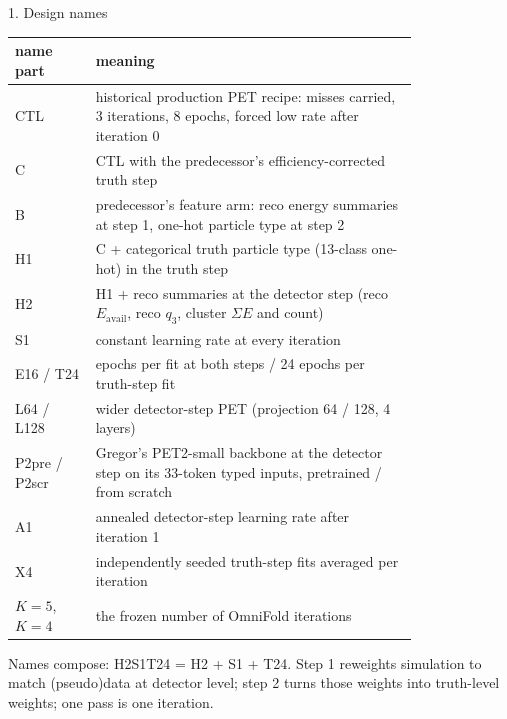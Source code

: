 \documentclass[aspectratio=169,10pt]{beamer}
\def\evidencetext{}
\begin{document}
\gdef\evidencetext{\texttt{DEVELOPMENT-20260926.md}; \texttt{PROTOCOL-20260925.md (5)}}
\begin{frame}{1. Design names}
{\scriptsize
\begin{tabular}{l>{\raggedright\arraybackslash}p{0.80\linewidth}}
\toprule
name part & meaning \\
\midrule
CTL & historical production PET recipe: misses carried, 3 iterations, 8 epochs, forced low rate after iteration 0 \\
C & CTL with the predecessor's efficiency-corrected truth step \\
B & predecessor's feature arm: reco energy summaries at step 1, one-hot particle type at step 2 \\
H1 & C + categorical truth particle type (13-class one-hot) in the truth step \\
H2 & H1 + reco summaries at the detector step (reco $E_\mathrm{avail}$, reco $q_3$, cluster $\Sigma E$ and count) \\
S1 & constant learning rate at every iteration \\
E16 / T24 & 16 epochs per fit at both steps / 24 epochs per truth-step fit \\
L64 / L128 & wider detector-step PET (projection 64 / 128, 4 layers) \\
P2pre / P2scr & Gregor's PET2-small backbone at the detector step on its 33-token typed inputs, pretrained / from scratch \\
A1 & annealed detector-step learning rate after iteration 1 \\
X4 & 4 independently seeded truth-step fits averaged per iteration \\
$K{=}5$, $K{=}4$ & the frozen number of OmniFold iterations \\
\bottomrule
\end{tabular}}\par\vspace{0.1cm}\scriptsize Names compose: H2S1T24 = H2 + S1 + T24. Step 1 reweights simulation to match (pseudo)data at detector level; step 2 turns those weights into truth-level weights; one pass is one iteration.
\end{frame}
\end{document}
